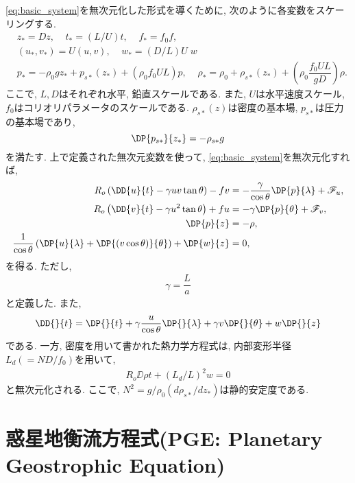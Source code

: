 \eqref{eq:basic_system}を無次元化した形式を導くために,  
次のように各変数をスケーリングする. 
\begin{align*}
  & z_*=Dz, \;\;\;\;  t_* = (L/U)t, \;\;\;\; f_* = f_0 f, \\
  & (u_*,v_*) = U (u, v), \;\;\;\; w_* = (D/L)U \; w \\
  & p_* = - \rho_0 g z_* + p_{s*}(z_*) +  (\rho_0 f_0 U L) p, \;\;\;\;
   \rho_* = \rho_0 + \rho_{s*}(z_*) + (\rho_0 \dfrac{f_0 UL}{gD}) \rho. 
\end{align*}
ここで, $L, D$はそれぞれ水平, 鉛直スケールである. 
また, $U$は水平速度スケール, $f_0$はコリオリパラメータのスケールである. 
$\rho_{s*}(z)$は密度の基本場, $p_{s*}$は圧力の基本場であり, 
$$
 \DP{p_{s*}}{z_*} = - \rho_{s*} g
$$
を満たす. 
上で定義された無次元変数を使って, \eqref{eq:basic_system}を無次元化すれば, 
\begin{subequations} %
  \begin{align}
    R_o \left( \DD{u}{t} - \gamma uv \tan\theta \right)  - f v  &= - \dfrac{\gamma}{\cos \theta} \DP{p}{\lambda} + \mathscr{F}_u, \\
    R_o \left( \DD{v}{t} - \gamma u^2 \tan\theta \right)   + fu &= - \gamma \DP{p}{\theta} + \mathscr{F}_v, \\
    \DP{p}{z} &= - \rho, \\
    \dfrac{1}{\cos \theta} \left( \DP{u}{\lambda} + \DP{ (v \cos{\theta})}{\theta} \right)  + \DP{w}{z} &= 0, \\
  \end{align}
\label{eq:basic_system_nondim}
\end{subequations}
を得る. 
ただし, 
\begin{align}
  \gamma = \dfrac{L}{a}
\end{align}
と定義した. また, 
\begin{equation}
  \DD{}{t} =  \DP{}{t} + \gamma \dfrac{u}{\cos \theta}\DP{}{\lambda} + \gamma v \DP{}{\theta} + w\DP{}{z}
\end{equation}
である. 
一方, 密度を用いて書かれた熱力学方程式は, 
内部変形半径$L_d(=ND/f_0)$を用いて, 
\begin{align}
   R_o \DD{\rho}{t} + (L_d/L)^2 w = 0
\label{eq:basic_system_densEq_nondim}  
\end{align}
と無次元化される. 
ここで, $N^2 = g/\rho_0 (d\rho_{s*}/dz_*)$は静的安定度である. 


\section{惑星地衡流方程式(PGE: Planetary Geostrophic Equation)}

